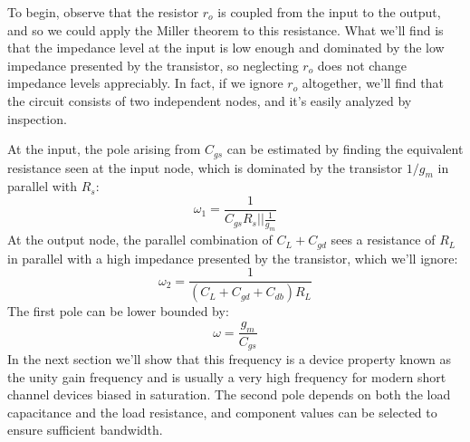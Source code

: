 To begin, observe that the resistor $r_o$ is coupled from the input to the output, and so we could apply the Miller theorem to this resistance.  What we'll find is that the impedance level at the input is low enough and dominated by the low impedance presented by the transistor, so neglecting $r_o$ does not change impedance levels appreciably.  In fact, if we ignore $r_o$ altogether, we'll find that the circuit consists of two independent nodes, and it's easily analyzed by inspection.

At the input, the pole arising from $C_{gs}$ can be estimated by finding the equivalent resistance seen at the input node, which is dominated by the transistor $1/g_m$ in parallel with $R_s$:
\begin{equation}
	\omega_1 = \frac{1}{C_{gs} R_s||\frac{1}{g_m}}
\end{equation}    
At the output node, the parallel combination of $C_L + C_{gd}$ sees a resistance of $R_L$ in parallel with a high impedance presented by the transistor, which we'll ignore:
\begin{equation}
	\omega_2 = \frac{1}{(C_{L} + C_{gd} + C_{db}) R_L}
\end{equation}    
The first pole can be lower bounded by:
\begin{equation}
	\omega = \frac{g_m}{C_{gs}}
\end{equation}
In the next section we'll show that this frequency is a device property known as the unity gain frequency and is usually a very high frequency for modern short channel devices biased in saturation.  The second pole depends on both the load capacitance and the load resistance, and component values can be selected to ensure sufficient bandwidth.

